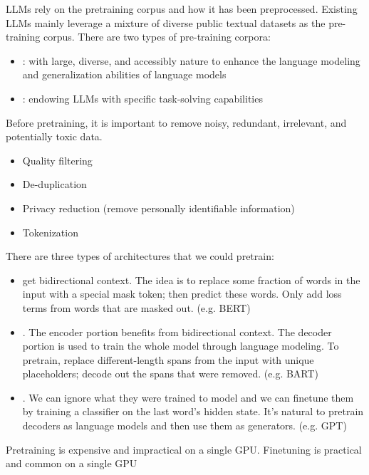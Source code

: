 \documentclass{article}
\begin{document}
LLMs rely on the pretraining corpus and how it has been preprocessed. Existing LLMs mainly leverage a mixture of diverse public textual datasets as the pre-training corpus. There are two types of pre-training corpora: 
\begin{itemize}
  \item {}: with large, diverse, and accessibly nature to enhance the language modeling and generalization abilities of language models 
  \item {}: endowing LLMs with specific task-solving capabilities
\end{itemize}

Before pretraining, it is important to remove noisy, redundant, irrelevant, and potentially toxic data. 
\begin{itemize}
  \item Quality filtering 
  \item De-duplication 
  \item Privacy reduction (remove personally identifiable information)
  \item Tokenization 
\end{itemize}

There are three types of architectures that we could pretrain:
\begin{itemize}
  \item {} get bidirectional context. The idea is to replace some fraction of words in the input with a special mask token; then predict these words. Only add loss terms from words that are masked out. (e.g. BERT)
  \item {}. The encoder portion benefits from bidirectional context. The decoder portion is used to train the whole model through language modeling. To pretrain, replace different-length spans from the input with unique placeholders; decode out the spans that were removed. (e.g. BART)
  \item {}. We can ignore what they were trained to model and we can finetune them by training a classifier on the last word's hidden state. It's natural to pretrain decoders as language models and then use them as generators. (e.g. GPT)
\end{itemize}

\begin{remark}
  Pretraining is expensive and impractical on a single GPU. Finetuning is practical and common on a single GPU
\end{remark}
\end{document}
